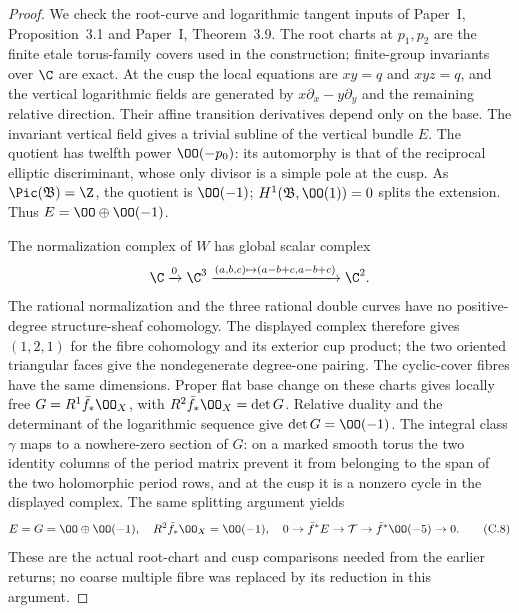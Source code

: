 \begin{proof}
We check the root-curve and logarithmic tangent inputs of Paper~I, Proposition~3.1 and Paper~I, Theorem~3.9. The root charts at $p_1,p_2$ are the finite etale torus-family covers used in the construction; finite-group invariants over $\C$ are exact. At the cusp the local equations are $xy=q$ and $xyz=q$, and the vertical logarithmic fields are generated by $x\partial_x-y\partial_y$ and the remaining relative direction. Their affine transition derivatives depend only on the base. The invariant vertical field gives a trivial subline of the vertical bundle $E$. The quotient has twelfth power $\OO(-p_0)$: its automorphy is that of the reciprocal elliptic discriminant, whose only divisor is a simple pole at the cusp. As $\Pic(\mathfrak B)=\Z$, the quotient is $\OO(-1)$; $H^1(\mathfrak B,\OO(1))=0$ splits the extension. Thus $E=\OO\oplus\OO(-1)$.

The normalization complex of $W$ has global scalar complex
\[
 \C\xrightarrow{0}\C^3
 \xrightarrow{(a,b,c)\mapsto(a-b+c,a-b+c)}\C^2.
\]
The rational normalization and the three rational double curves have no positive-degree structure-sheaf cohomology. The displayed complex therefore gives $(1,2,1)$ for the fibre cohomology and its exterior cup product; the two oriented triangular faces give the nondegenerate degree-one pairing. The cyclic-cover fibres have the same dimensions. Proper flat base change on these charts gives locally free $G=R^1\bar f_*\OO_X$, with $R^2\bar f_*\OO_X=\det G$. Relative duality and the determinant of the logarithmic sequence give $\det G=\OO(-1)$. The integral class $\gamma$ maps to a nowhere-zero section of $G$: on a marked smooth torus the two identity columns of the period matrix prevent it from belonging to the span of the two holomorphic period rows, and at the cusp it is a nonzero cycle in the displayed complex. The same splitting argument yields
\[
E=G=\OO\oplus\OO(-1),\quad R^2\bar f_*\OO_X=\OO(-1),
\quad0\to\bar f^*E\to\mathcal T\to\bar f^*\OO(-5)\to0. \tag{C.8}\label{cdp:eq:C.8}
\]
These are the actual root-chart and cusp comparisons needed from the earlier returns; no coarse multiple fibre was replaced by its reduction in this argument.


\end{proof}
